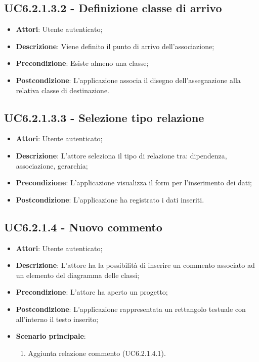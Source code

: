 \subsection{UC6.2.1.3.2 - Definizione classe di arrivo} 
\label{ssec:UC6.2.1.3.2} 
\begin{itemize} 
\item \textbf{Attori}: Utente autenticato;
\item \textbf{Descrizione}: Viene definito il punto di arrivo dell'associazione;
\item \textbf{Precondizione}: Esiste almeno una classe;
\item \textbf{Postcondizione}: L'applicazione associa il disegno dell'assegnazione alla relativa classe di destinazione.
\end{itemize} 
\subsection{UC6.2.1.3.3 - Selezione tipo relazione} 
\label{ssec:UC6.2.1.3.3} 
\begin{itemize} 
\item \textbf{Attori}: Utente autenticato;
\item \textbf{Descrizione}: L'attore seleziona il tipo di relazione tra: dipendenza, associazione, gerarchia;
\item \textbf{Precondizione}: L'applicazione visualizza il form per l'inserimento dei dati;
\item \textbf{Postcondizione}: L'applicazione ha registrato i dati inseriti.
\end{itemize} 
\subsection{UC6.2.1.4 - Nuovo commento} 
\label{ssec:UC6.2.1.4} 
\begin{itemize} 
\item \textbf{Attori}: Utente autenticato;
\item \textbf{Descrizione}: L'attore ha la possibilità di inserire un commento associato ad un elemento del diagramma delle classi;
\item \textbf{Precondizione}: L'attore ha aperto un progetto;
\item \textbf{Postcondizione}: L'applicazione rappresentata un rettangolo testuale con all'interno il testo inserito;
\item \textbf{Scenario principale}: \begin{enumerate}\item Aggiunta relazione commento (UC6.2.1.4.1). 
 \end{enumerate}
\end{itemize} 
